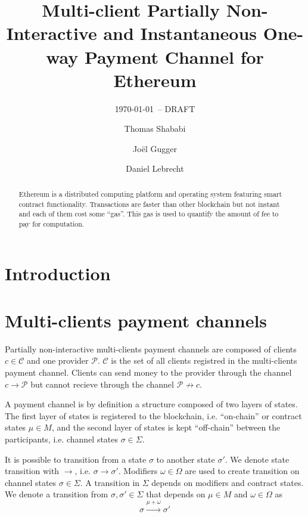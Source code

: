 \documentclass{llncs}
\begin{document}
\title{Multi-client Partially Non-Interactive and Instantaneous One-way Payment Channel for Ethereum}
\author{Thomas Shababi \and Jo\"el Gugger \and Daniel Lebrecht}

\subtitle{{\normalsize\today{\small\ -- DRAFT}}}

\maketitle

\begin{abstract} Ethereum is a distributed computing platform and operating system featuring smart contract functionality. Transactions are faster than other blockchain but not instant and each of them cost some ``gas''. This gas is used to quantify the amount of fee to pay for computation. 
\end{abstract}

\section{Introduction} 

\section{Multi-clients payment channels} Partially non-interactive multi-clients payment channels are composed of clients $c \in \mathcal{C}$ and one provider $\mathcal{P}$. $\mathcal{C}$ is the set of all clients registred in the multi-clients payment channel. Clients can send money to the provider through the channel $c \rightarrow \mathcal{P}$ but cannot recieve through the channel $\mathcal{P} \not\rightarrow c$.

A payment channel is by definition a structure composed of two layers of states. The first layer of states is registered to the blockchain, i.e. ``on-chain'' or contract states $\mu \in M$, and the second layer of states is kept ``off-chain'' between the participants, i.e. channel states $\sigma \in \Sigma$.

It is possible to transition from a state $\sigma$ to another state $\sigma'$. We denote state transition with $\rightarrow$, i.e. $\sigma \rightarrow \sigma'$.  Modifiers $\omega \in \Omega$ are used to create transition on channel states $\sigma \in \Sigma$. A transition in $\Sigma$ depends on modifiers and contract states. We denote a transition from $\sigma, \sigma' \in \Sigma$ that depends on $\mu \in M$ and $\omega \in \Omega$ as
$$\sigma \xrightarrow{\mu+\omega} \sigma'$$
\end{document}
